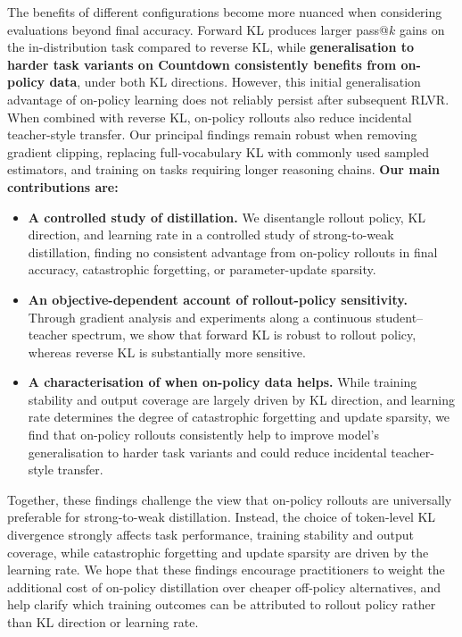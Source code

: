 \documentclass{article} %
\theoremstyle{plain}
\theoremstyle{definition}
\theoremstyle{remark}
\begin{document}
The benefits of different configurations become more nuanced when considering evaluations beyond final accuracy. Forward KL produces larger pass@$k$ gains on the in-distribution task compared to reverse KL, while \textbf{generalisation to harder task variants on Countdown consistently benefits from on-policy data}, under both KL directions. However, this initial generalisation advantage of on-policy learning does not reliably persist after subsequent RLVR. When combined with reverse KL, on-policy rollouts also reduce incidental teacher-style transfer. Our principal findings remain robust when removing gradient clipping, replacing full-vocabulary KL with commonly used sampled estimators, and training on tasks requiring longer reasoning chains. \textbf{Our main contributions are:}
\begin{itemize}[leftmargin=20pt]
\item \textbf{A controlled study of distillation.} We disentangle rollout policy, KL direction, and learning rate in a controlled study of strong-to-weak distillation, finding no consistent advantage from on-policy rollouts in final accuracy, catastrophic forgetting, or parameter-update sparsity.
\item \textbf{An objective-dependent account of rollout-policy sensitivity.} Through gradient analysis and experiments along a continuous student--teacher spectrum, we show that forward KL is robust to rollout policy, whereas reverse KL is substantially more sensitive.
\item \textbf{A characterisation of when on-policy data helps.} While training stability and output coverage are largely driven by KL direction, and learning rate determines the degree of catastrophic forgetting and update sparsity, we find that on-policy rollouts consistently help to improve model's generalisation to harder task variants and could reduce incidental teacher-style transfer.
\end{itemize}

Together, these findings challenge the view that on-policy rollouts are universally preferable for strong-to-weak distillation.
Instead, the choice of token-level KL divergence strongly affects task performance, training stability and output coverage, while catastrophic forgetting and update sparsity are driven by the learning rate. 
We hope that these findings encourage practitioners to weight the additional cost of on-policy distillation over cheaper off-policy alternatives, and help clarify which training outcomes can be attributed to rollout policy rather than KL direction or learning rate.
\end{document}
